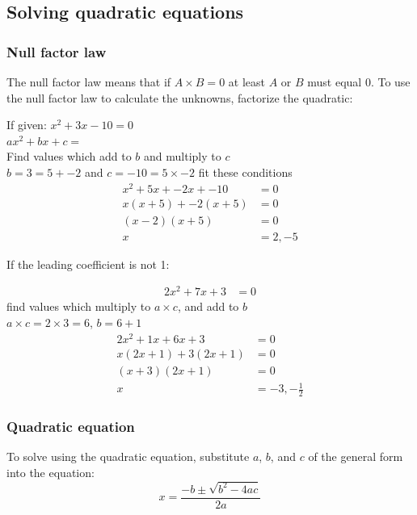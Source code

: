 \documentclass{report}
\begin{document}
\subsection{Solving quadratic equations}
\subsubsection{Null factor law}
The null factor law means that if $A \times B = 0$ at least $A$ or $B$ must equal 0.
To use the null factor law to calculate the unknowns, factorize the quadratic:
\begin{center}
	If given: $x^2 + 3x - 10 = 0$\\
	$ax^2 + bx + c = $\\
	Find values which add to $b$ and multiply to $c$\\
	$b = 3 = 5 + -2$ and $c = -10 = 5 \times -2$ fit these conditions
	\begin{align*}
		x^2 + 5x + -2x + -10 & = 0     \\
		x(x + 5) + -2(x + 5) & = 0     \\
		(x - 2)(x + 5)       & = 0     \\
		x                    & = 2, -5
	\end{align*}
\end{center}

If the leading coefficient is not 1:
\begin{center}
	\begin{align*}
		2x^2 + 7x + 3 & = 0
	\end{align*}
	find values which multiply to $a \times c$, and add to $b$\\
	$a \times c = 2 \times 3 = 6$, $b = 6 + 1$
	\begin{align*}
		2x^2 + 1x + 6x + 3    & = 0                \\
		x(2x + 1) + 3(2x + 1) & = 0                \\
		(x + 3)(2x + 1)       & = 0                \\
		x                     & = -3, -\frac{1}{2}
	\end{align*}
\end{center}

\subsubsection{Quadratic equation}
To solve using the quadratic equation, substitute $a$, $b$, and $c$ of the general form into the equation:
$$
	x = \frac{-b \pm \sqrt{b^2 - 4ac}}{2a}
$$
\end{document}
